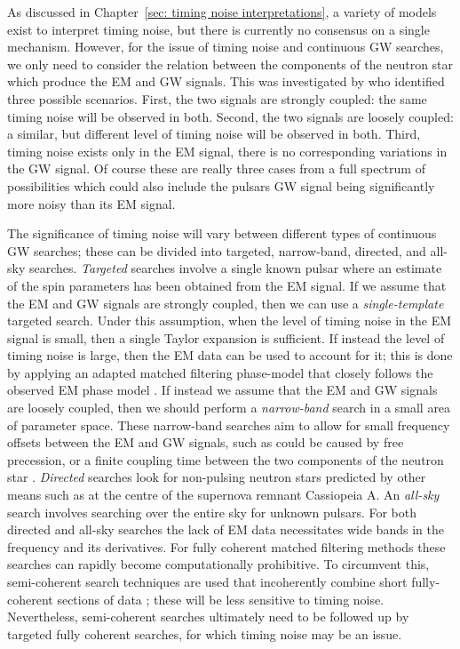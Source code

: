 \documentclass[../full_thesis/full_thesis.tex]{subfiles}
\begin{document}
As discussed in Chapter~\ref{sec: timing noise interpretations},
a variety of models exist to interpret timing noise, but there is
currently no consensus on a single mechanism. However, for the issue of timing
noise and continuous GW searches, we only need to consider the relation between the
components of the neutron star which produce the EM and GW signals.  This was
investigated by \citet{Jones2004} who identified three possible scenarios.
First, the two signals are strongly coupled: the same timing noise will be
observed in both. Second, the two signals are loosely coupled: a similar, but
different level of timing noise will be observed in both. Third, timing noise
exists only in the EM signal, there is no corresponding variations in the GW
signal. Of course these are really three cases from a full spectrum of
possibilities which could also include the pulsars GW signal being
significantly more noisy than its EM signal.

The significance of timing noise will vary between different types of continuous GW
searches; these can be divided into targeted, narrow-band, directed, and
all-sky searches.  \emph{Targeted} searches involve a single known pulsar where
an estimate of the spin parameters has been obtained from the EM signal. If we
assume that the EM and GW signals are strongly coupled, then we can use a
\emph{single-template} targeted search. Under this assumption, when the level
of timing noise in the EM signal is small, then a single Taylor expansion is
sufficient.  If instead the level of timing noise is large, then the EM data
can be used to account for it; this is done by applying an adapted
matched filtering phase-model that closely follows the observed EM phase model
\citep{Pitkin2004}. If instead we assume that the EM and GW signals are
loosely coupled, then we should perform a \emph{narrow-band} search in a small
area of parameter space.  These narrow-band searches aim to allow for small
frequency offsets between the EM and GW signals, such as could be caused by
free precession, or a finite coupling time between the two components of the
neutron star \citep{abbott2008beating}. \emph{Directed} searches look for non-pulsing
neutron stars predicted by other means such as at the centre of the supernova
remnant Cassiopeia A. An \emph{all-sky} search involves searching over the
entire sky for unknown pulsars. For both directed and all-sky searches the lack
of EM data necessitates wide bands in the frequency and its derivatives. For
fully coherent matched filtering methods these searches can rapidly become
computationally prohibitive. To circumvent this, semi-coherent search
techniques are used that incoherently combine short fully-coherent sections of
data \citep{abadie2012all}; these will be less sensitive to timing noise.
Nevertheless, semi-coherent searches  ultimately need to be followed up by
targeted fully coherent searches, for which timing noise may be an issue.
\end{document}
